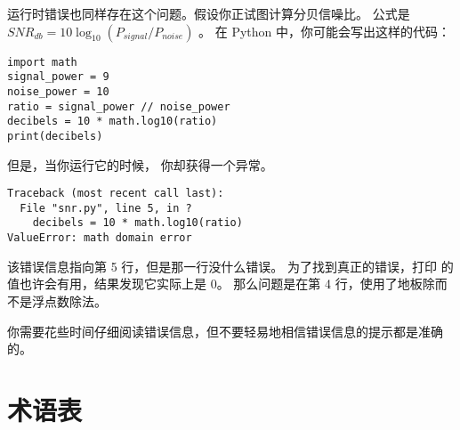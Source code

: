 {{{{运行时错误也同样存在这个问题。假设你正试图计算分贝信噪比。
公式是 $SNR_{db} = 10 \log_{10} (P_{signal} / P_{noise})$ 。
在 Python 中，你可能会写出这样的代码：

\begin{lstlisting}
import math
signal_power = 9
noise_power = 10
ratio = signal_power // noise_power
decibels = 10 * math.log10(ratio)
print(decibels)
\end{lstlisting}

%

但是，当你运行它的时候， 你却获得一个异常。

%
  

\begin{lstlisting}
Traceback (most recent call last):
  File "snr.py", line 5, in ?
    decibels = 10 * math.log10(ratio)
ValueError: math domain error
\end{lstlisting}

%

该错误信息指向第 5 行，但是那一行没什么错误。
为了找到真正的错误，打印  的值也许会有用，结果发现它实际上是 0。
那么问题是在第 4 行，使用了地板除而不是浮点数除法。
  


你需要花些时间仔细阅读错误信息，但不要轻易地相信错误信息的提示都是准确的。

\section{术语表}

\begin{description}



\end{description}}}}}

